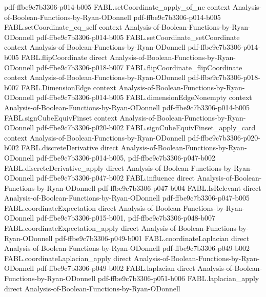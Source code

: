 \begin{theorem}
  {pdf-ffbe9c7b3306-p014-b005}
\proofstep
  {FABL.setCoordinate_apply_of_ne}
  {context}
  {Analysis-of-Boolean-Functions-by-Ryan-ODonnell}
  {pdf-ffbe9c7b3306-p014-b005}
\proofstep
  {FABL.setCoordinate_eq_self}
  {context}
  {Analysis-of-Boolean-Functions-by-Ryan-ODonnell}
  {pdf-ffbe9c7b3306-p014-b005}
\proofstep
  {FABL.setCoordinate_setCoordinate}
  {context}
  {Analysis-of-Boolean-Functions-by-Ryan-ODonnell}
  {pdf-ffbe9c7b3306-p014-b005}
\proofstep
  {FABL.flipCoordinate}
  {direct}
  {Analysis-of-Boolean-Functions-by-Ryan-ODonnell}
  {pdf-ffbe9c7b3306-p018-b007}
\proofstep
  {FABL.flipCoordinate_flipCoordinate}
  {context}
  {Analysis-of-Boolean-Functions-by-Ryan-ODonnell}
  {pdf-ffbe9c7b3306-p018-b007}
\proofstep
  {FABL.DimensionEdge}
  {context}
  {Analysis-of-Boolean-Functions-by-Ryan-ODonnell}
  {pdf-ffbe9c7b3306-p014-b005}
\proofstep
  {FABL.dimensionEdgeNonempty}
  {context}
  {Analysis-of-Boolean-Functions-by-Ryan-ODonnell}
  {pdf-ffbe9c7b3306-p014-b005}
\proofstep
  {FABL.signCubeEquivFinset}
  {context}
  {Analysis-of-Boolean-Functions-by-Ryan-ODonnell}
  {pdf-ffbe9c7b3306-p020-b002}
\proofstep
  {FABL.signCubeEquivFinset_apply_card}
  {context}
  {Analysis-of-Boolean-Functions-by-Ryan-ODonnell}
  {pdf-ffbe9c7b3306-p020-b002}
\proofstep
  {FABL.discreteDerivative}
  {direct}
  {Analysis-of-Boolean-Functions-by-Ryan-ODonnell}
  {pdf-ffbe9c7b3306-p014-b005,
    pdf-ffbe9c7b3306-p047-b002}
\proofstep
  {FABL.discreteDerivative_apply}
  {direct}
  {Analysis-of-Boolean-Functions-by-Ryan-ODonnell}
  {pdf-ffbe9c7b3306-p047-b002}
\proofstep
  {FABL.influence}
  {direct}
  {Analysis-of-Boolean-Functions-by-Ryan-ODonnell}
  {pdf-ffbe9c7b3306-p047-b004}
\proofstep
  {FABL.IsRelevant}
  {direct}
  {Analysis-of-Boolean-Functions-by-Ryan-ODonnell}
  {pdf-ffbe9c7b3306-p047-b005}
\proofstep
  {FABL.coordinateExpectation}
  {direct}
  {Analysis-of-Boolean-Functions-by-Ryan-ODonnell}
  {pdf-ffbe9c7b3306-p015-b001,
    pdf-ffbe9c7b3306-p048-b007}
\proofstep
  {FABL.coordinateExpectation_apply}
  {direct}
  {Analysis-of-Boolean-Functions-by-Ryan-ODonnell}
  {pdf-ffbe9c7b3306-p049-b001}
\proofstep
  {FABL.coordinateLaplacian}
  {direct}
  {Analysis-of-Boolean-Functions-by-Ryan-ODonnell}
  {pdf-ffbe9c7b3306-p049-b002}
\proofstep
  {FABL.coordinateLaplacian_apply}
  {direct}
  {Analysis-of-Boolean-Functions-by-Ryan-ODonnell}
  {pdf-ffbe9c7b3306-p049-b002}
\proofstep
  {FABL.laplacian}
  {direct}
  {Analysis-of-Boolean-Functions-by-Ryan-ODonnell}
  {pdf-ffbe9c7b3306-p051-b006}
\proofstep
  {FABL.laplacian_apply}
  {direct}
  {Analysis-of-Boolean-Functions-by-Ryan-ODonnell}

\end{theorem}
